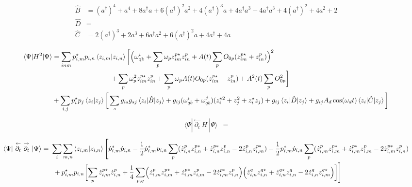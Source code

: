 \documentclass[prb]{revtex4}
\newcommand{\eq}[1]{\begin{align}#1\end{align}}
\begin{document}
%
\begin{align*}						
\hat B &= (a^\dag)^4 + a^4 + 8a^\dag a + 6 (a^\dag)^2 a^2 + 4 (a^\dag)^3 a + 4 a^\dag a^3 + 4 a^\dag a^3 + 4 (a^\dag)^2 + 4 a^2 + 2 \\
\hat D &= \\
\hat C &= 2 (a^\dag)^3 + 2 a^3 + 6 a^\dag a^2 + 6 (a^\dag)^2 a + 4 a^\dag + 4 a \\
\end{align*}
%
\begin{align*}						
\braket{\Psi |  H^2 | \Psi}  & =\sum_{inm} p_{i,m}^\star p_{i,n} \braket{ z_{i,m} | z_{i,n} } \bigg[\Bigl( \omega_{\rm qb}^i +\sum_p \omega_p z_{im}^{p\star} z_{in}^p + A(t)\sum_p O_{0p}(z_{im}^{p\star}+z_{in}^p)\Bigr)^2 \notag \\
& \hspace{3cm}+ \sum_p \omega_p^2 z_{im}^{p\star} z_{in}^p + \sum_p\omega_p A(t)O_{0p}(z_{im}^{p\star}+z_{in}^p) +A^2(t)\sum_p O_{0p}^2  \bigg] \notag \\
& +\sum_{i,j}p_{i}^\star p_{j}\braket{z_{i}|z_{j}} \bigg[  \sum_s  g_{is}g_{sj} \braket{z_i | \hat B | z_j} + g_{ij}(\omega_{qb}^i + \omega_{qb}^j) (z_i^{\star 2} + z_j^2+z_i^{\star } z_j) + g_{ij} \braket{z_i | \hat D | z_j}+ g_{ij} A_d \cos(\omega_d t) \braket{z_i | \hat C | z_j}  \bigg] 
\end{align*}
%
\eq{	
\langle \Psi |\ \overset{\leftarrow}{\partial_t}\ H\ | \Psi \rangle &=  
}
%					 
\begin{align*}
	  \braket{\Psi |\  \overset{\leftarrow}{\partial_t}\ \overset{\rightarrow}{\partial_t}\ | \Psi} =\ &\sum_i \sum_{m,n} \braket{z_{i,m} | z_{i,n}} \Biggl[  \dot p_{i,m}^{*}\dot p_{i,n} - \frac{1}{2} \dot p_{i,m}^{*}p_{i,n}  \sum_p (  \dot z_{i,n}^{p} z^{p*}_{i,n} +  \dot z_{i,n}^{p*} z^p_{i,n} - 2 \dot z_{i,n}^{p} z^{p*}_{i,m} ) - \frac{1}{2} p_{i,m}^{*}\dot p_{i,n} \sum_p (  \dot z_{i,m}^{p} z^{p*}_{i,m} +  \dot z_{i,m}^{p*} z^p_{i,m} - 2 \dot z_{i,m}^{p*} z^{p}_{i,n}) \\
						&\ + p_{i,m}^\star p_{i,n} \biggl[ \sum_p  \dot z_{i,m}^{p\star} \dot z_{i,n}^p + \frac{1}{4}\sum_{p,q} \Bigl( \dot z_{i,m}^{p} z^{p\star}_{i,m}+\dot z_{i,m}^{p*} z^p_{i,m} - 2\dot z_{i,m}^{p*} z^{p}_{i,n}\Bigr) \Bigl(     \dot z_{i,n}^{q} z^{q\star}_{i,n} + \dot z_{i,n}^{q\star} z^{q}_{i,n} - 2  \dot z_{i,n}^{q} z^{q\star}_{i,m} \Bigr) \biggr] \Biggl] 
\end{align*}
%		
\end{document}
